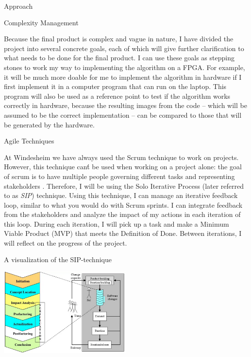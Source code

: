 \documentclass{matthijs}
\begin{document}
	\begin{hoofdstuk}{Approach}

		\begin{paragraaf}{Complexity Management}
			
			Because the final product is complex and vague in nature, I have divided the project into several concrete goals, each of which will give further clarification to what needs to be done for the final product.
			I can use these goals as stepping stones to work my way to implementing the algorithm on a FPGA.
			For example, it will be much more doable for me to implement the algorithm in hardware if I first implement it in a computer program that can run on the laptop.
			This program will also be used as a reference point to test if the algorithm works correctly in hardware, because the resulting images from the code -- which will be assumed to be the correct implementation -- can be compared to those that will be generated by the hardware.
		
		\end{paragraaf}

		\begin{paragraaf}{Agile Techniques}
			
			At Windesheim we have always used the Scrum technique to work on projects.
			However, this technique can\'t be used when working on a project alone: the goal of scrum is to have multiple people governing different tasks and representing stakeholders \cite{gant2019scrum}.
			Therefore, I will be using the Solo Iterative Process \cite{dorman2012sip} (later referred to as \textit{SIP}) technique.
			Using this technique, I can manage an iterative feedback loop, similar to what you would do with Scrum sprints.
			I can integrate feedback from the stakeholders and analyze the impact of my actions in each iteration of this loop.
			During each iteration, I will pick up a task and make a Minimum Viable Product (MVP) that meets the Definition of Done.
			Between iterations, I will reflect on the progress of the project.

			\begin{figuur}{A visualization of the SIP-technique}

				\includegraphics[width=0.5\textwidth]{sip.png}  \cite{dorman2012sip}


\end{figuur}
\end{paragraaf}
\end{hoofdstuk}
\end{document}
